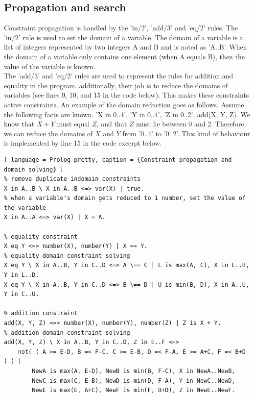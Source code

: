 \documentclass{report}
\begin{document}
\subsection{Propagation and search}
Constraint propagation is handled by the 'in/2', 'add/3' and 'eq/2' rules. The 'in/2' rule is used to set the domain of a variable. The domain of a variable is a list of integers represented by two integers A and B and is noted as 'A..B'. When the domain of a variable only contains one element (when A equals B), then the value of the variable is known. \\
The 'add/3' and 'eq/2' rules are used to represent the rules for addition and equality in the program. additionally, their job is to reduce the domains of variables (see lines 9, 10, and 15 in the code below). This makes these constraints active constraints. An example of the domain reduction goes as follows. Assume the following facts are known. 'X in 0..4', 'Y in 0..4', 'Z in 0..2', add(X, Y, Z). We know that \(X + Y\) must equal \(Z\), and that \(Z\) must lie between 0 and 2. Therefore, we can reduce the domains of \(X\) and \(Y\) from '0..4' to '0..2'. This kind of behaviour is implemented by line 15 in the code excerpt below.
\begin{lstlisting}[ language = Prolog-pretty, caption = {Constraint propagation and domain solving} ]
% remove duplicate indomain constraints
X in A..B \ X in A..B <=> var(X) | true.
% when a variable's domain gets reduced to 1 number, set the value of the variable
X in A..A <=> var(X) | X = A.

% equality constraint
X eq Y <=> number(X), number(Y) | X == Y.
% equality domain constraint solving
X eq Y \ X in A..B, Y in C..D <=> A \== C | L is max(A, C), X in L..B, Y in L..D.
X eq Y \ X in A..B, Y in C..D <=> B \== D | U is min(B, D), X in A..U, Y in C..U.

% addition constraint
add(X, Y, Z) <=> number(X), number(Y), number(Z) | Z is X + Y.
% addition domain constraint solving
add(X, Y, Z) \ X in A..B, Y in C..D, Z in E..F <=>
    not( ( A >= E-D, B =< F-C, C >= E-B, D =< F-A, E >= A+C, F =< B+D ) ) |
        NewA is max(A, E-D), NewB is min(B, F-C), X in NewA..NewB,
        NewC is max(C, E-B), NewD is min(D, F-A), Y in NewC..NewD,
        NewE is max(E, A+C), NewF is min(F, B+D), Z in NewE..NewF.
\end{lstlisting}
\end{document}
